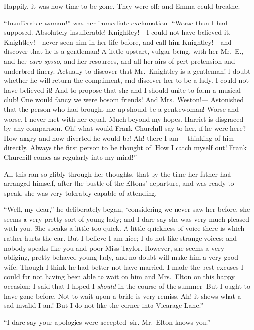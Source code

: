Happily, it was now time to be gone.  They were off; and Emma
could breathe.

``Insufferable woman!'' was her immediate exclamation.  ``Worse than I
had supposed.  Absolutely insufferable!  Knightley!---I could not
have believed it.  Knightley!---never seen him in her life before,
and call him Knightley!---and discover that he is a gentleman!
A little upstart, vulgar being, with her Mr.\ E., and her \emph{caro sposo},
and her resources, and all her airs of pert pretension and
underbred finery.  Actually to discover that Mr.\ Knightley is
a gentleman!  I doubt whether he will return the compliment,
and discover her to be a lady.  I could not have believed it!
And to propose that she and I should unite to form a musical club!
One would fancy we were bosom friends!  And Mrs.\ Weston!---%
Astonished that the person who had brought me up should be
a gentlewoman!  Worse and worse.  I never met with her equal.
Much beyond my hopes.  Harriet is disgraced by any comparison.
Oh! what would Frank Churchill say to her, if he were here?
How angry and how diverted he would be!  Ah! there I am---%
thinking of him directly.  Always the first person to be thought of!
How I catch myself out!  Frank Churchill comes as regularly into
my mind!''---%

All this ran so glibly through her thoughts, that by the time
her father had arranged himself, after the bustle of the Eltons'
departure, and was ready to speak, she was very tolerably capable
of attending.

``Well, my dear,'' he deliberately began, ``considering we never saw
her before, she seems a very pretty sort of young lady; and I dare say
she was very much pleased with you.  She speaks a little too quick.
A little quickness of voice there is which rather hurts the ear.
But I believe I am nice; I do not like strange voices; and nobody speaks
like you and poor Miss Taylor.  However, she seems a very obliging,
pretty-behaved young lady, and no doubt will make him a very good wife.
Though I think he had better not have married.  I made the best
excuses I could for not having been able to wait on him and Mrs.\ Elton
on this happy occasion; I said that I hoped I \emph{should} in the course
of the summer.  But I ought to have gone before.  Not to wait upon
a bride is very remiss.  Ah! it shews what a sad invalid I am!
But I do not like the corner into Vicarage Lane.''

``I dare say your apologies were accepted, sir.  Mr.\ Elton knows you.''

